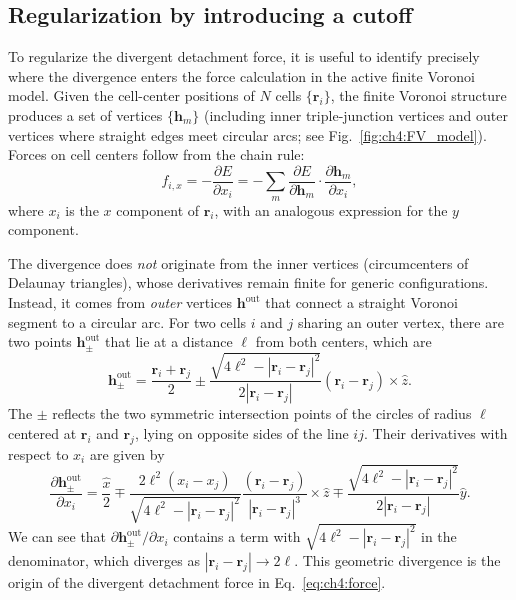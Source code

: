 \subsection{Regularization by introducing a cutoff}
\label{sec:ch4:regularization}

To regularize the divergent detachment force, it is useful to identify precisely where the divergence enters the force calculation in the active finite Voronoi model.
Given the cell-center positions of $N$ cells $\{\mathbf{r}_i\}$, the finite Voronoi structure produces a set of vertices $\{\mathbf{h}_m\}$ (including inner triple-junction vertices and outer vertices where straight edges meet circular arcs; see Fig.~\ref{fig:ch4:FV_model}).
Forces on cell centers follow from the chain rule:
\begin{equation}
\label{eq:ch4:chainrule}
    {f}_{i,x}=-\frac{\partial E}{\partial x_i}=-\sum_m\frac{\partial E}{\partial \mathbf{h}_m}\cdot\frac{\partial \mathbf{h}_m}{\partial x_i},
\end{equation}
where $x_i$ is the $x$ component of $\mathbf{r}_i$, with an analogous expression for the $y$ component.

The divergence does \emph{not} originate from the inner vertices (circumcenters of Delaunay triangles), whose derivatives remain finite for generic configurations.
Instead, it comes from \emph{outer} vertices $\mathbf{h}^{\mathrm{out}}$ that connect a straight Voronoi segment to a circular arc.
For two cells $i$ and $j$ sharing an outer vertex, there are two points $\mathbf{h}_\pm^\mathrm{out}$ that lie at a distance $\ell$ from both centers, which are~\cite{teomy2018confluent}
\begin{equation}
\label{eq:ch4:hout}
    \mathbf{h}^{\textrm{out}}_\pm=\frac{\mathbf{r}_i+\mathbf{r}_j}{2}\pm\frac{\sqrt{4\ell^2-|\mathbf{r}_i-\mathbf{r}_j|^2}}{2|\mathbf{r}_i-\mathbf{r}_j|}(\mathbf{r}_i-\mathbf{r}_j)\times\hat{z}.
\end{equation}
The $\pm$ reflects the two symmetric intersection points of the circles of radius $\ell$ centered at $\mathbf{r}_i$ and $\mathbf{r}_j$, lying on opposite sides of the line $ij$.
Their derivatives with respect to $x_i$ are given by
\begin{equation}
\label{eq:ch4:outer-deriv}
    \frac{\partial \mathbf{h}^\textrm{out}_\pm}{\partial x_i}=\dfrac{\hat{x}}{2}\mp\frac{2\ell^2(x_i-x_j)}{\sqrt{4\ell^2-|\mathbf{r}_i-\mathbf{r}_j|^2}}\frac{(\mathbf{r}_i-\mathbf{r}_j)}{|\mathbf{r}_i-\mathbf{r}_j|^3}\times\hat{z}\mp\frac{\sqrt{4\ell^2-|\mathbf{r}_i-\mathbf{r}_j|^2}}{2|\mathbf{r}_i-\mathbf{r}_j|}\hat{y}.
\end{equation}
We can see that $\partial \mathbf{h}_\pm^{\mathrm{out}}/\partial x_i$ contains a term with $\sqrt{4\ell^2-|\mathbf{r}_i-\mathbf{r}_j|^2}$ in the denominator, which diverges as $|\mathbf{r}_i-\mathbf{r}_j|\to2\ell$.
This geometric divergence is the origin of the divergent detachment force in Eq.~\eqref{eq:ch4:force}.

